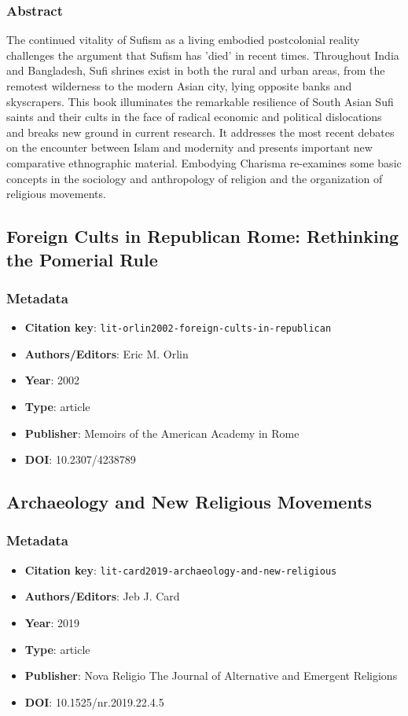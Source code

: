 \subsubsection*{Abstract}
The continued vitality of Sufism as a living embodied postcolonial reality challenges the argument that Sufism has 'died' in recent times. Throughout India and Bangladesh, Sufi shrines exist in both the rural and urban areas, from the remotest wilderness to the modern Asian city, lying opposite banks and skyscrapers. This book illuminates the remarkable resilience of South Asian Sufi saints and their cults in the face of radical economic and political dislocations and breaks new ground in current research. It addresses the most recent debates on the encounter between Islam and modernity and presents important new comparative ethnographic material. Embodying Charisma re-examines some basic concepts in the sociology and anthropology of religion and the organization of religious movements.

\subsection{Foreign Cults in Republican Rome: Rethinking the Pomerial Rule}\label{lit:lit-orlin2002-foreign-cults-in-republican}
\subsubsection*{Metadata}
\begin{itemize}
  \item \textbf{Citation key}: \texttt{lit-orlin2002-foreign-cults-in-republican}
  \item \textbf{Authors/Editors}: Eric M. Orlin
  \item \textbf{Year}: 2002
  \item \textbf{Type}: article
  \item \textbf{Publisher}: Memoirs of the American Academy in Rome
  \item \textbf{DOI}: 10.2307/4238789
\end{itemize}

\subsection{Archaeology and New Religious Movements}\label{lit:lit-card2019-archaeology-and-new-religious}
\subsubsection*{Metadata}
\begin{itemize}
  \item \textbf{Citation key}: \texttt{lit-card2019-archaeology-and-new-religious}
  \item \textbf{Authors/Editors}: Jeb J. Card
  \item \textbf{Year}: 2019
  \item \textbf{Type}: article
  \item \textbf{Publisher}: Nova Religio The Journal of Alternative and Emergent Religions
  \item \textbf{DOI}: 10.1525/nr.2019.22.4.5
\end{itemize}
